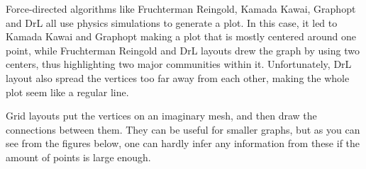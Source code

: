 \documentclass[12pt, a4paper]{article}
\begin{document}
Force-directed algorithms like Fruchterman Reingold, Kamada Kawai, Graphopt and DrL  all use physics simulations to generate a plot. In this case, it led to Kamada Kawai and Graphopt making a plot that is mostly centered around one point, while Fruchterman Reingold and DrL layouts drew the graph by using two centers, thus highlighting two major communities within it. Unfortunately, DrL layout also spread the vertices too far away from each other, making the whole plot seem like a regular line.

\newpage

Grid layouts put the vertices on an imaginary mesh, and then draw the connections between them. They can be useful for smaller graphs, but as you can see from the figures below, one can hardly infer any information from these if the amount of points is large enough.
\end{document}
